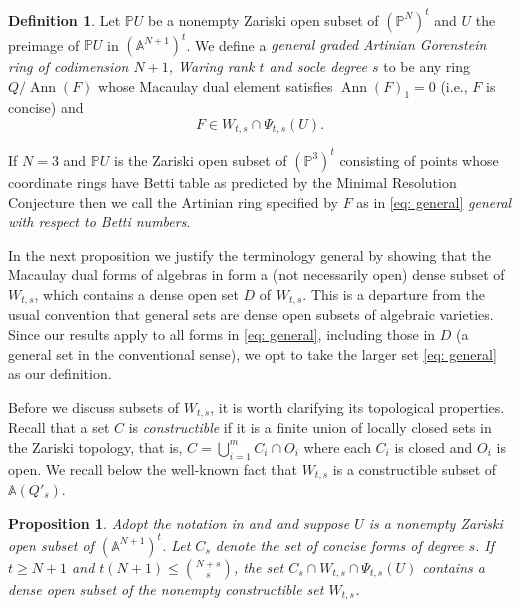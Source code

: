 \documentclass[reqno]{amsart}
\DeclareMathOperator{\Ann}{Ann}
\newcommand{\A}{\mathbb{A}}
\renewcommand{\P}{\mathbb{P}}
\theoremstyle{plain} %
\newtheorem{prop}[theorem]{Proposition}
\theoremstyle{definition}
\newtheorem{definition}[theorem]{Definition}
\theoremstyle{remark}
\begin{document}
\begin{definition}\label{general AG}
Let $\P U$ be a nonempty Zariski open subset of $(\P^N)^t$ and $U$ the preimage of $\P U$ in $(\A^{N+1})^t$. We define a {\em general graded Artinian Gorenstein ring of codimension $N+1$, Waring rank $t$ and socle degree $s$} to be any ring $Q/\Ann(F)$ whose Macaulay dual element satisfies $\Ann(F)_1=0$ (i.e., $F$ is concise) and
\begin{equation}\label{eq: general}
F\in W_{t,s}\cap \Psi_{t,s}(U).
\end{equation}

If $N=3$ and $\P U$ is the Zariski open subset of $(\P^3)^t$ consisting of points whose coordinate rings have Betti table as predicted by the Minimal Resolution Conjecture then we call the Artinian ring specified by $F$ as in \eqref{eq: general} {\em general with respect to Betti numbers}.
\end{definition}

In the next proposition we justify the terminology general by showing that the Macaulay dual forms of algebras in  form a (not necessarily open) dense subset of $W_{t,s}$, which contains a dense open set $D$ of $W_{t,s}$. 
This  is a departure from the usual convention that general sets are dense open subsets of algebraic varieties.  Since our results apply to all forms in \eqref{eq: general}, including those in $D$ (a general set in the conventional sense), we opt to take the larger set \eqref{eq: general} as our definition.

Before we discuss subsets of $W_{t,s}$,  it is worth clarifying its topological properties.
Recall that a set $C$ is {\em constructible} if it is a finite union of locally closed sets in the Zariski topology, that is, $C=\bigcup_{i=1}^m C_i\cap O_i$ where each $C_i$ is closed and $O_i$ is open.
 We recall below the well-known fact that $W_{t,s}$ is a constructible subset of $\mathbb A(Q'_s)$. 
 
\begin{prop}\label{general is dense}
Adopt the notation in  and  and suppose $U$ is  a nonempty Zariski open subset of $(\A^{N+1})^t$. Let $C_s$ denote the set of concise forms of degree $s$. If $t\geq N+1$ and $t(N+1)\leq \binom{N+s}{s}$, the set  $C_s\cap W_{t,s}\cap \Psi_{t,s}(U)$  contains a dense open subset  of  the nonempty constructible set $W_{t,s}$.
\end{prop}
\end{document}
